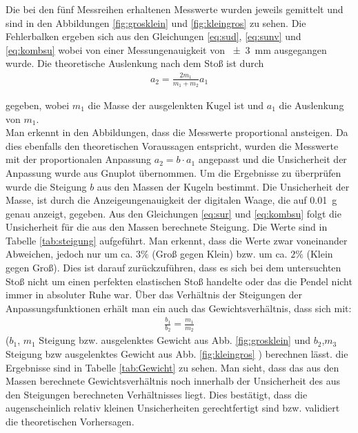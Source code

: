 Die bei den fünf Messreihen erhaltenen Messwerte wurden jeweils gemittelt und sind in den Abbildungen \ref{fig:grosklein} und \ref{fig:kleingros} zu sehen. Die Fehlerbalken ergeben sich aus den Gleichungen \ref{eq:sud}, \ref{eq:sunv} und \ref{eq:kombsu} wobei von einer Messungenauigkeit von \SI{+-3}{mm} ausgegangen wurde.
Die theoretische Auslenkung nach dem Stoß ist durch
\begin{align}
	a_2= \frac{2m_1}{m_1+m_2} a_1\label{eq:Auslenkung}
\end{align} 

gegeben, wobei $m_1$ die Masse der ausgelenkten Kugel ist und $a_1$ die Auslenkung von $m_1$.\\
Man erkennt in den Abbildungen, dass die Messwerte proportional ansteigen.
Da dies ebenfalls den theoretischen Voraussagen entspricht, wurden die Messwerte mit der proportionalen Anpassung $a_2=b \cdot a_1$ angepasst und die Unsicherheit der Anpassung wurde aus Gnuplot übernommen.
Um die Ergebnisse zu überprüfen wurde die Steigung $b$ aus den Massen der Kugeln bestimmt. Die Unsicherheit der Masse, ist durch die Anzeigeungenauigkeit der digitalen Waage, die auf \SI{0.01}{g} genau anzeigt, gegeben. Aus den Gleichungen \ref{eq:sur} und \ref{eq:kombsu} folgt die Unsicherheit für die aus den Massen berechnete Steigung. Die Werte sind in Tabelle \ref{tab:steigung} aufgeführt.
Man erkennt, dass die Werte zwar voneinander Abweichen, jedoch nur um ca. $3\%$ (Groß gegen Klein) bzw. um ca. $2\%$ (Klein gegen Groß). Dies ist darauf zurückzuführen, dass es sich bei dem untersuchten Stoß nicht um einen perfekten elastischen Stoß handelte oder das die Pendel nicht immer in absoluter Ruhe war.
Über das Verhältnis der Steigungen der Anpassungsfunktionen erhält man ein auch das Gewichtsverhältnis, dass sich mit: 
\begin{align}
\frac{b_1}{b_2}=\frac{m_1}{m_2}	
\end{align} 
($b_1$, $m_1$ Steigung bzw. ausgelenktes Gewicht aus Abb. \ref{fig:grosklein} und $b_2$,$m_3$ Steigung bzw ausgelenktes Gewicht aus Abb. \ref{fig:kleingros} ) berechnen lässt. die Ergebnisse sind in Tabelle \ref{tab:Gewicht} zu sehen.
Man sieht, dass das aus den Massen berechnete Gewichtsverhältnis  noch innerhalb der Unsicherheit des aus den Steigungen berechneten Verhältnisses liegt. Dies bestätigt, dass die augenscheinlich relativ kleinen Unsicherheiten gerechtfertigt sind bzw. validiert die theoretischen Vorhersagen.


